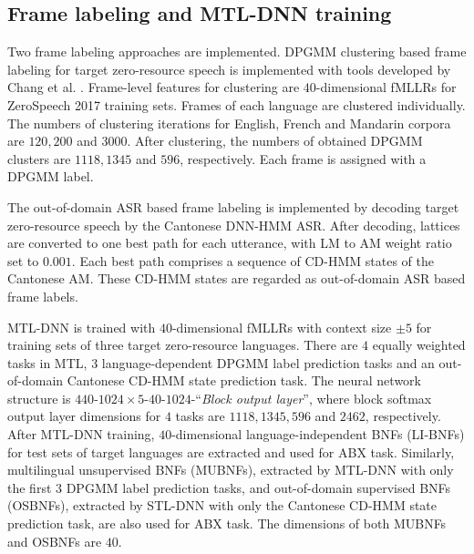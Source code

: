 \documentclass[a4paper]{article}
\newcommand{\quotes}[1]{``#1''}
\begin{document}
\subsection{Frame labeling and MTL-DNN training}
Two frame labeling approaches are implemented. DPGMM clustering based frame labeling for target zero-resource speech is implemented with tools developed by Chang et al. \cite{chang2013parallel}. Frame-level features for clustering are $40$-dimensional fMLLRs for ZeroSpeech 2017 training sets. Frames of each language are clustered individually. 
The numbers of clustering iterations for English, French and Mandarin corpora are $120, 200$ and $3000$. After clustering, the numbers of obtained DPGMM clusters are $1118, 1345$ and $596$, respectively. Each frame is assigned with a DPGMM label.

The out-of-domain ASR based frame labeling is implemented by decoding target zero-resource speech by the Cantonese DNN-HMM ASR.
After decoding, lattices are converted to one best path for each utterance, with LM to AM weight ratio set to $0.001$. Each best path comprises a sequence of CD-HMM states of the Cantonese AM. These CD-HMM states are regarded as out-of-domain ASR based frame labels.

MTL-DNN is trained with $40$-dimensional fMLLRs with context size $\pm 5$ for training sets of three target zero-resource languages. There are $4$ equally weighted tasks in MTL, $3$ language-dependent DPGMM label prediction tasks and an out-of-domain Cantonese CD-HMM state prediction task. The neural network structure is 
$440$-$1024\times 5$-$40$-$1024$-\quotes{\textit{Block output layer}},
where block softmax output layer dimensions for $4$ tasks are $1118, 1345, 596$ and $2462$, respectively. After MTL-DNN training, $40$-dimensional language-independent BNFs (LI-BNFs) for test sets of target languages are extracted and used for ABX task. Similarly, multilingual unsupervised BNFs (MUBNFs), extracted by MTL-DNN with only the first $3$ DPGMM label prediction tasks, and out-of-domain supervised BNFs (OSBNFs), extracted by STL-DNN with only the Cantonese CD-HMM state prediction task, are also used for ABX task. The dimensions of both MUBNFs and OSBNFs are $40$.
\end{document}
